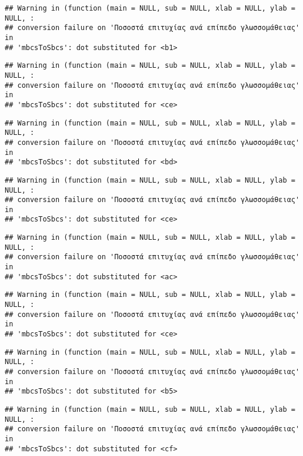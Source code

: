 \documentclass[
]{article}
\begin{document}
\begin{verbatim}
## Warning in (function (main = NULL, sub = NULL, xlab = NULL, ylab = NULL, :
## conversion failure on 'Ποσοστά επιτυχίας ανά επίπεδο γλωσσομάθειας' in
## 'mbcsToSbcs': dot substituted for <b1>
\end{verbatim}

\begin{verbatim}
## Warning in (function (main = NULL, sub = NULL, xlab = NULL, ylab = NULL, :
## conversion failure on 'Ποσοστά επιτυχίας ανά επίπεδο γλωσσομάθειας' in
## 'mbcsToSbcs': dot substituted for <ce>
\end{verbatim}

\begin{verbatim}
## Warning in (function (main = NULL, sub = NULL, xlab = NULL, ylab = NULL, :
## conversion failure on 'Ποσοστά επιτυχίας ανά επίπεδο γλωσσομάθειας' in
## 'mbcsToSbcs': dot substituted for <bd>
\end{verbatim}

\begin{verbatim}
## Warning in (function (main = NULL, sub = NULL, xlab = NULL, ylab = NULL, :
## conversion failure on 'Ποσοστά επιτυχίας ανά επίπεδο γλωσσομάθειας' in
## 'mbcsToSbcs': dot substituted for <ce>
\end{verbatim}

\begin{verbatim}
## Warning in (function (main = NULL, sub = NULL, xlab = NULL, ylab = NULL, :
## conversion failure on 'Ποσοστά επιτυχίας ανά επίπεδο γλωσσομάθειας' in
## 'mbcsToSbcs': dot substituted for <ac>
\end{verbatim}

\begin{verbatim}
## Warning in (function (main = NULL, sub = NULL, xlab = NULL, ylab = NULL, :
## conversion failure on 'Ποσοστά επιτυχίας ανά επίπεδο γλωσσομάθειας' in
## 'mbcsToSbcs': dot substituted for <ce>
\end{verbatim}

\begin{verbatim}
## Warning in (function (main = NULL, sub = NULL, xlab = NULL, ylab = NULL, :
## conversion failure on 'Ποσοστά επιτυχίας ανά επίπεδο γλωσσομάθειας' in
## 'mbcsToSbcs': dot substituted for <b5>
\end{verbatim}

\begin{verbatim}
## Warning in (function (main = NULL, sub = NULL, xlab = NULL, ylab = NULL, :
## conversion failure on 'Ποσοστά επιτυχίας ανά επίπεδο γλωσσομάθειας' in
## 'mbcsToSbcs': dot substituted for <cf>
\end{verbatim}
\end{document}
